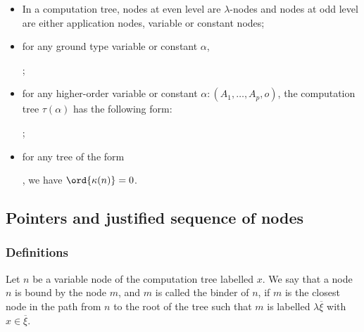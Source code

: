 \begin{remark} \hfill
\begin{itemize}
\item In a computation tree, nodes at even level are $\lambda$-nodes and nodes at odd level are either application nodes,
variable or constant nodes;

\item for any ground type variable or constant $\alpha$,
;

\item for any higher-order variable or constant $\alpha : (A_1,\ldots,A_p,o)$, the computation tree $\tau(\alpha)$ has the following form:
;

\item for any tree of the form
, we have $\ord{\kappa(n)}=0$.
\end{itemize}
\end{remark}


\subsection{Pointers and justified sequence of nodes}
\subsubsection{Definitions}
\begin{definition}[Binder]
Let $n$ be a variable node of the computation tree labelled $x$. We
say that a node $n$ is bound by the node $m$, and $m$ is called the
binder of $n$, if $m$ is the closest node in the path from $n$ to
the root of the tree such that $m$ is labelled $\lambda
\overline{\xi}$ with $x\in \overline{\xi}$.
\end{definition}

